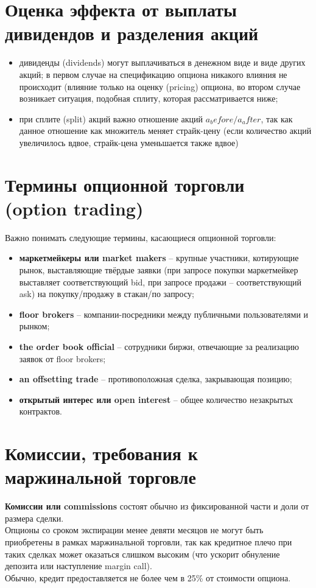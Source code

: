 \documentclass{article}
\begin{document}
\section{Оценка эффекта от выплаты дивидендов и разделения акций}
 \begin{itemize}
    \item дивиденды (dividends) могут выплачиваться в денежном виде и виде других акций; в первом случае на спецификацию опциона никакого влияния не происходит (влияние только на оценку (pricing) опциона, во втором случае возникает ситуация, подобная сплиту, которая рассматривается ниже;
    \item при сплите (split) акций важно отношение акций \(a_before/a_after\), так как данное отношение как множитель меняет страйк-цену (если количество акций увеличилось вдвое, страйк-цена уменьшается также вдвое)
 \end{itemize}
\section{Термины опционной торговли (option trading)}
Важно понимать следующие термины, касающиеся опционной торговли:
 \begin{itemize}
    \item \textbf{маркетмейкеры или market makers} -- крупные участники, котирующие рынок, выставляющие твёрдые заявки (при запросе покупки маркетмейкер выставляет соответствующий bid, при запросе продажи -- соответствующий ask) на покупку/продажу в стакан/по запросу;
    \item \textbf{floor brokers} -- компании-посредники между публичными пользователями и рынком;
    \item \textbf{the order book official} -- сотрудники биржи, отвечающие за реализацию заявок от floor brokers;
    \item \textbf{an offsetting trade} -- противоположная сделка, закрывающая позицию;
    \item \textbf{открытый интерес или open interest} -- общее количество незакрытых контрактов.
 \end{itemize}
 \section{Комиссии, требования к маржинальной торговле}
 \textbf{Комиссии или commissions} состоят обычно из фиксированной части и доли от размера сделки.\\
 Опционы со сроком экспирации менее девяти месяцов не могут быть приобретены в рамках маржинальной торговли, так как кредитное плечо при таких сделках может оказаться слишком высоким (что ускорит обнуление депозита или наступление margin call).\\
 Обычно, кредит предоставляется не более чем в 25\% от стоимости опциона.
\end{document}
